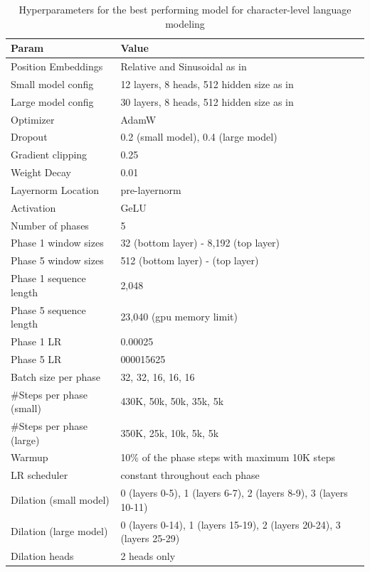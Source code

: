 \documentclass[11pt,a4paper]{article}
\begin{document}
\begin{table}
 \centering
 \small
\begin{tabular}{@{}ll@{}}
\toprule
Param & Value \\
\midrule
Position Embeddings & Relative and Sinusoidal as in~\citet{transformerxl} \\
Small model config & 12 layers, 8 heads, 512 hidden size as in~\citet{transformerxl} \\
Large model config & 30 layers, 8 heads, 512 hidden size as in~\citet{sparseOpenai} \\
Optimizer & AdamW \\
Dropout & 0.2 (small model), 0.4  (large model) \\
Gradient clipping & 0.25 \\
Weight Decay & 0.01 \\
Layernorm Location & pre-layernorm~\cite{layernorm} \\
Activation & GeLU \\
Number of phases & 5 \\
Phase 1 window sizes & 32 (bottom layer) - 8,192 (top layer) \\
Phase 5 window sizes & 512 (bottom layer) -  (top layer) \\
Phase 1 sequence length & 2,048 \\
Phase 5 sequence length & 23,040  (gpu memory limit) \\
Phase 1 LR & 0.00025 \\
Phase 5 LR & 000015625 \\
Batch size per phase & 32, 32, 16, 16, 16 \\
\#Steps per phase (small) & 430K, 50k, 50k, 35k, 5k \\
\#Steps per phase (large) & 350K, 25k, 10k, 5k, 5k \\
Warmup & 10\% of the phase steps with maximum 10K steps \\
LR scheduler & constant throughout each phase \\
Dilation (small model) & 0 (layers 0-5), 1 (layers 6-7), 2 (layers 8-9), 3 (layers 10-11) \\
Dilation (large model) & 0 (layers 0-14), 1 (layers 15-19), 2 (layers 20-24), 3 (layers 25-29) \\
Dilation heads & 2 heads only \\
\bottomrule
\end{tabular}
\caption{Hyperparameters for the best performing model for character-level language modeling}
\label{tab:char-hyperparams}
 \end{table}
\end{document}
